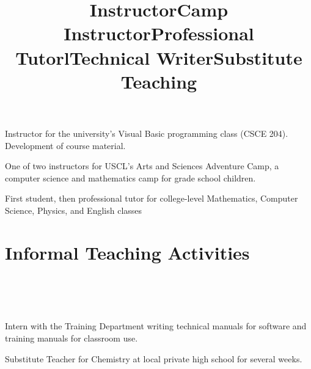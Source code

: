 \documentclass[overlapped,line,letterpaper]{res}
\begin{document}
\begin{resume}
\title{Instructor}
\begin{position}
Instructor for the university's Visual Basic programming class (CSCE 204).  Development of course material.
\end{position}

\title{Camp Instructor}
\begin{position}
One of two instructors for USCL's Arts and Sciences Adventure Camp, a computer science and mathematics camp for grade school children.
\end{position}

\title{Professional Tutor}
\begin{position}
First student, then professional tutor for college-level Mathematics, Computer Science, Physics, and English classes
\end{position}


\section{\bf Informal Teaching Activities}

\begin{format}
\title{l}\\
\\
\body\\
\end{format}

\title{Technical Writer}
\begin{position}
Intern with the Training Department writing technical manuals for software and training manuals for classroom use.
\end{position}

\title{Substitute Teaching}
\begin{position}
Substitute Teacher for Chemistry at local private high school for several weeks.
\end{position}


\end{resume}
\end{document}
